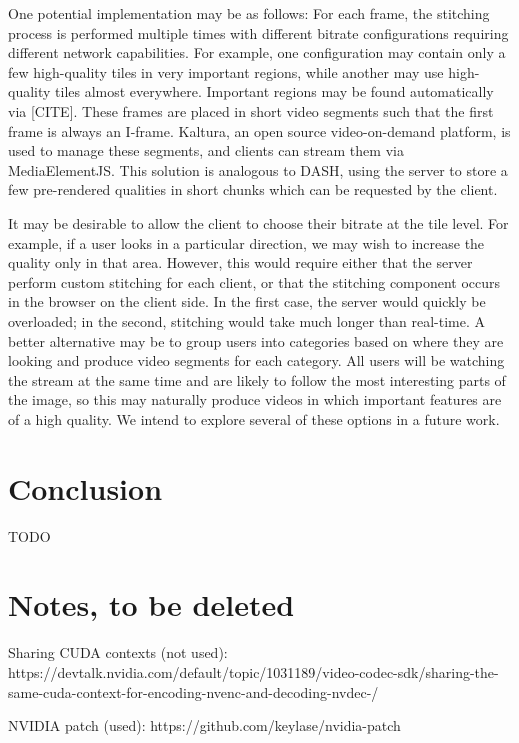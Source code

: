 One potential implementation may be as follows: For each frame, the stitching process is performed multiple times with different bitrate configurations requiring different network capabilities. For example, one configuration may contain only a few high-quality tiles in very important regions, while another may use high-quality tiles almost everywhere. Important regions may be found automatically via [CITE]. These frames are placed in short video segments such that the first frame is always an I-frame. Kaltura, an open source video-on-demand platform, is used to manage these segments, and clients can stream them via MediaElementJS. This solution is analogous to DASH, using the server to store a few pre-rendered qualities in short chunks which can be requested by the client.

It may be desirable to allow the client to choose their bitrate at the tile level. For example, if a user looks in a particular direction, we may wish to increase the quality only in that area. However, this would require either that the server perform custom stitching for each client, or that the stitching component occurs in the browser on the client side. In the first case, the server would quickly be overloaded; in the second, stitching would take much longer than real-time. A better alternative may be to group users into categories based on where they are looking and produce video segments for each category. All users will be watching the stream at the same time and are likely to follow the most interesting parts of the image, so this may naturally produce videos in which important features are of a high quality. We intend to explore several of these options in a future work.

\section{Conclusion}

TODO

\section{Notes, to be deleted}
Sharing CUDA contexts (not used): https://devtalk.nvidia.com/default/topic/1031189/video-codec-sdk/sharing-the-same-cuda-context-for-encoding-nvenc-and-decoding-nvdec-/

NVIDIA patch (used): https://github.com/keylase/nvidia-patch

